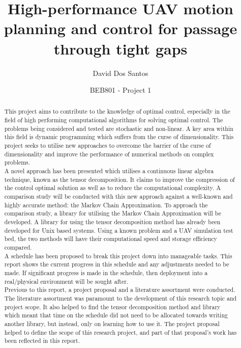 \documentclass[11pt,draftd]{article}
\begin{document}
\title{High-performance UAV motion planning and control for passage through tight gaps}
\author{David Dos Santos}
\date{BEB801 - Project 1}
\maketitle

\[\]
\[\]
\[\]
\renewcommand{\abstractname}{Executive Summary}
\begin{abstract}
	\[\]
	\noindent This project aims to contribute to the knowledge of optimal control, especially in the field of high performing computational algorithms for solving optimal control. The problems being considered and tested are stochastic and non-linear. A key area within this field is dynamic programming which suffers from the curse of dimensionality. This project seeks to utilise new approaches to overcome the barrier of the curse of dimensionality and improve the performance of numerical methods on complex problems. \\
	
	\noindent A novel approach has been presented which utilises a continuous linear algebra technique, known as the tensor decomposition. It claims to improve the compression of the control optimal solution as well as to reduce the computational complexity. A comparison study will be conducted with this new approach against a well-known and highly accurate method: the Markov Chain Approximation. To approach the comparison study, a library for utilising the Markov Chain Approximation will be developed. A library for using the tensor decomposition method has already been developed for Unix based systems. Using a known problem and a UAV simulation test bed, the two methods will have their computational speed and storage efficiency compared. \\
	
	\noindent A schedule has been proposed to break this project down into manageable tasks. This report shows the current progress in this schedule and any adjustments needed to be made. If significant progress is made in the schedule, then deployment into a real/physical environment will be sought after. \\
	
	\noindent Previous to this report, a project proposal and a literature assortment were conducted. The literature assortment was paramount to the development of this research topic and project scope. It also helped to find the tensor decomposition method and library which meant that time on the schedule did not need to be allocated towards writing another library, but instead, only on learning how to use it. The project proposal helped to define the scope of this research project, and part of that proposal's work has been reflected in this report. \\
	

\end{abstract}
\end{document}
